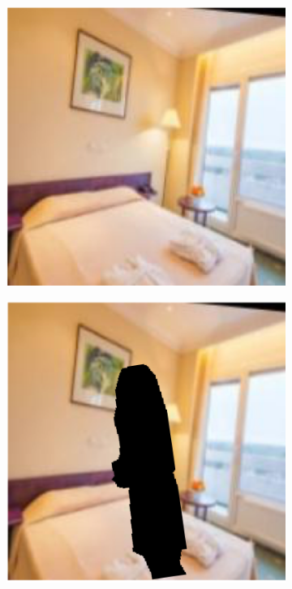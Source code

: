 \begin{figure}
\begin{subfigure}[b]{.19\columnwidth}
        \caption{}
    \end{subfigure}
    \begin{subfigure}[b]{.19\columnwidth}
        \centering
        \includegraphics[width=.98\columnwidth]{figures/chapter5/data_augmentation/3.png}
        \caption{}
    \end{subfigure}
    \begin{subfigure}[b]{.19\columnwidth}
        \centering
        \includegraphics[width=.98\columnwidth]{figures/chapter5/data_augmentation/4.png}

\end{subfigure}
\end{figure}
